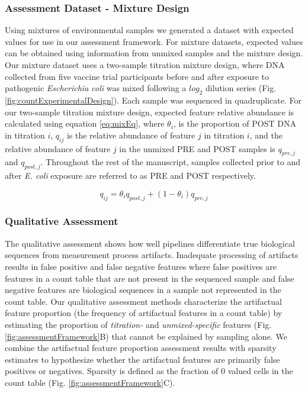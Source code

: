 \documentclass[linenumbers]{bmcart}
\begin{document}
\subsubsection*{Assessment Dataset - Mixture Design}

Using mixtures of environmental samples we generated a dataset with expected values for use in our assessment framework. 
For mixture datasets, expected values can be obtained using information from unmixed samples and the mixture design.
Our mixture dataset uses a two-sample titration mixture design, where DNA collected from five vaccine trial participants before and
after exposure to pathogenic \emph{Escherichia coli} was mixed following a \(log_2\) dilution series (Fig. \ref{fig:countExperimentalDesign}).
Each sample was sequenced in quadruplicate.
For our two-sample titration mixture design, expected feature
relative abundance is calculated using equation \eqref{eq:mixEq},
where \(\theta_i\), is the proportion of POST DNA in titration \(i\),
\(q_{ij}\) is the relative abundance of feature \(j\) in titration
\(i\), and the relative abundance of feature \(j\) in the unmixed PRE
and POST samples is \(q_{pre,j}\) and \(q_{post,j}\).
Throughout the rest of the manuscript, samples collected prior to and after \emph{E. coli} exposure are referred to as PRE and POST respectively.

\begin{equation}
  q_{ij} = \theta_i q_{post,j} + (1 - \theta_i) q_{pre,j}
  \label{eq:mixEq}
\end{equation}

\subsubsection*{Qualitative Assessment}
The qualitative assessment shows how well pipelines differentiate true biological sequences from measurement process artifacts.
Inadequate processing of artifacts results in false positive and false negative features where false positives are features in a count table that are not present in the sequenced sample and false negative features are biological sequences in a sample not represented in the count table.
Our qualitative assessment methods characterize the artifactual feature proportion (the frequency of artifactual features in a count table) by estimating the proportion of \emph{titration-} and \emph{unmixed-specific} features (Fig. \ref{fig:assessmentFramework}B) that cannot be explained by sampling alone.
We combine the artifactual feature proportion assessment results with sparsity estimates to hypothesize whether the artifactual features are primarily false positives or negatives.
Sparsity is defined as the fraction of 0 valued cells in the count table (Fig. \ref{fig:assessmentFramework}C).
\end{document}
